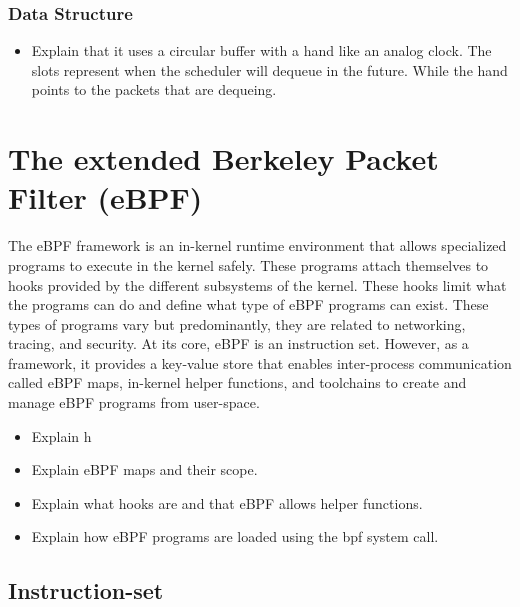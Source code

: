 \documentclass[sigconf, nonacm]{acmart}
\begin{document}
\subsubsection{Data Structure}

\begin{itemize}
  \item Explain that it uses a circular buffer with a hand like an analog clock. The slots represent when the scheduler will dequeue in the future. While the hand points to the packets that are dequeing.
\end{itemize}


\section{The extended Berkeley Packet Filter (eBPF)}

The eBPF framework is an in-kernel runtime environment that allows specialized
programs to execute in the kernel safely. These programs attach themselves to
hooks provided by the different subsystems of the kernel. These hooks limit what
the programs can do and define what type of eBPF programs can exist. These types
of programs vary but predominantly, they are related to networking, tracing, and
security. At its core, eBPF is an instruction set. However, as a framework, it
provides a key-value store that enables inter-process communication called eBPF
maps, in-kernel helper functions, and toolchains to create and manage eBPF
programs from user-space.


\begin{itemize}
  \item Explain h
  \item Explain eBPF maps and their scope.
  \item Explain what hooks are and that eBPF allows helper functions.
  \item Explain how eBPF programs are loaded using the bpf system call.
\end{itemize}


\subsection{Instruction-set}

\end{document}
